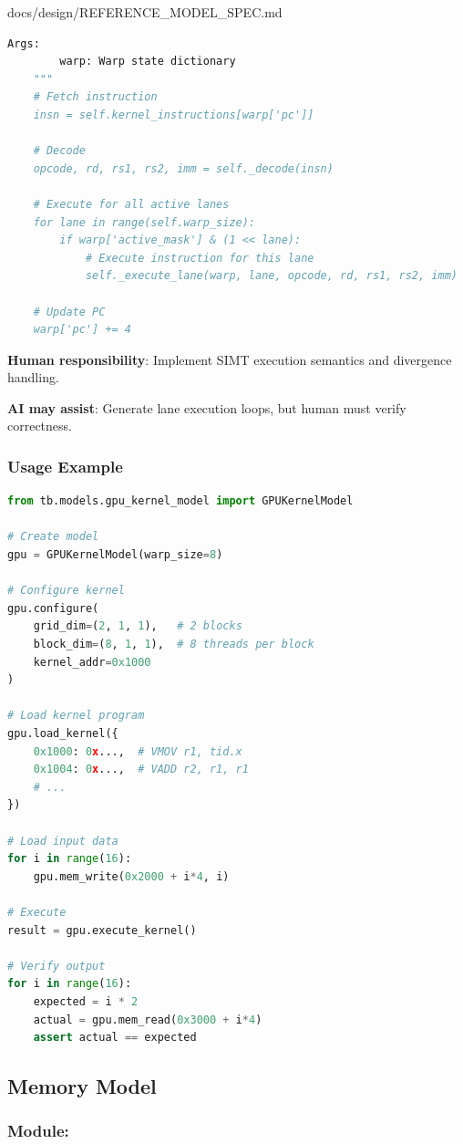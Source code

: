 \begin{relocated}{docs/design/REFERENCE_MODEL_SPEC.md}
\begin{lstlisting}[language=Python]
    Args:
        warp: Warp state dictionary
    """
    # Fetch instruction
    insn = self.kernel_instructions[warp['pc']]

    # Decode
    opcode, rd, rs1, rs2, imm = self._decode(insn)

    # Execute for all active lanes
    for lane in range(self.warp_size):
        if warp['active_mask'] & (1 << lane):
            # Execute instruction for this lane
            self._execute_lane(warp, lane, opcode, rd, rs1, rs2, imm)

    # Update PC
    warp['pc'] += 4
\end{lstlisting}

\textbf{Human responsibility}: Implement SIMT execution semantics and
divergence handling.

\textbf{AI may assist}: Generate lane execution loops, but human must
verify correctness.

\subsubsection{Usage Example}\label{ds:ch:reference-model:usage-example-1}

\begin{lstlisting}[language=Python]
from tb.models.gpu_kernel_model import GPUKernelModel

# Create model
gpu = GPUKernelModel(warp_size=8)

# Configure kernel
gpu.configure(
    grid_dim=(2, 1, 1),   # 2 blocks
    block_dim=(8, 1, 1),  # 8 threads per block
    kernel_addr=0x1000
)

# Load kernel program
gpu.load_kernel({
    0x1000: 0x...,  # VMOV r1, tid.x
    0x1004: 0x...,  # VADD r2, r1, r1
    # ...
})

# Load input data
for i in range(16):
    gpu.mem_write(0x2000 + i*4, i)

# Execute
result = gpu.execute_kernel()

# Verify output
for i in range(16):
    expected = i * 2
    actual = gpu.mem_read(0x3000 + i*4)
    assert actual == expected
\end{lstlisting}

\subsection{Memory Model}\label{ds:ch:reference-model:memory-model}

\subsubsection{\texorpdfstring{Module:
}{Module: }}\label{ds:ch:reference-model:module-tbmodelsmemory-modelpy}


\end{relocated}
